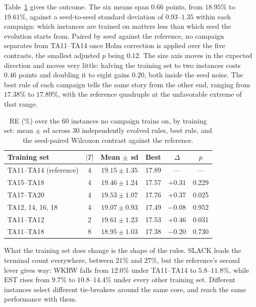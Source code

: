 \documentclass[review,authoryear,11pt]{elsarticle}
\newcommand{\rev}[1]{\textcolor{revcolor}{#1}}
\begin{document}
\rev{Table~\ref{tab:trainset} gives the outcome. The six means span
$0.66$ points, from $18.95\%$ to $19.61\%$, against a seed-to-seed
standard deviation of $0.93$--$1.35$ within each campaign: which
instances are trained on matters less than which seed the evolution
starts from. Paired by seed against the reference, no campaign separates
from TA11--TA14 once Holm correction is applied over the five contrasts,
the smallest adjusted $p$ being $0.12$. The size axis moves in the
expected direction and moves very little: halving the training set to
two instances costs $0.46$ points and doubling it to eight gains $0.20$,
both inside the seed noise. The best rule of each campaign tells the
same story from the other end, ranging from $17.38\%$ to $17.89\%$, with
the reference quadruple at the unfavorable extreme of that range.}

\begin{table}[t]
\centering\small
\color{revcolor}
\caption{\rev{RE (\%) over the 60 instances no campaign trains on, by
training set: mean $\pm$ sd across 30 independently evolved rules, best
rule, and the seed-paired Wilcoxon contrast against the reference.}}
\label{tab:trainset}
\begin{tabular}{lccccc}
\toprule
Training set & $|T|$ & Mean $\pm$ sd & Best & $\Delta$ & $p$ \\
\midrule
TA11--TA14 (reference) & 4 & $19.15 \pm 1.35$ & 17.89 & --- & --- \\
TA15--TA18 & 4 & $19.46 \pm 1.24$ & 17.57 & $+0.31$ & 0.229 \\
TA17--TA20 & 4 & $19.53 \pm 1.07$ & 17.76 & $+0.37$ & 0.025 \\
TA12, 14, 16, 18 & 4 & $19.07 \pm 0.93$ & 17.49 & $-0.08$ & 0.952 \\
TA11--TA12 & 2 & $19.61 \pm 1.23$ & 17.53 & $+0.46$ & 0.031 \\
TA11--TA18 & 8 & $18.95 \pm 1.03$ & 17.38 & $-0.20$ &
0.730 \\
\bottomrule
\end{tabular}
\end{table}

\rev{What the training set does change is the shape of the rules. SLACK
leads the terminal count everywhere, between $21\%$ and $27\%$, but the
reference's second lever gives way: WKRW falls from $12.0\%$ under
TA11--TA14 to $5.8$--$11.8\%$, while EST rises from $9.7\%$ to
$10.8$--$14.4\%$ under every other training set. Different instances
select different tie-breakers around the same core, and reach the same
performance with them.}
\end{document}
